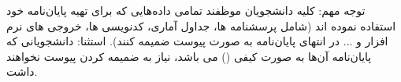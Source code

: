توجه مهم:
کلیه دانشجویان موظفند تمامی داده‌هایی که برای تهیه پایان‌نامه خود استفاده
نموده اند (شامل پرسشنامه ها، جداول آماری، کدنویسی ها، خروجی های نرم افزار
و ...  در انتهای پایان‌نامه به صورت پیوست ضمیمه کنند).
استثنا: دانشجویانی که پایان‌نامه آن‌ها به صورت کیفی () می باشد، نیاز به ضمیمه کردن پیوست نخواهند داشت.